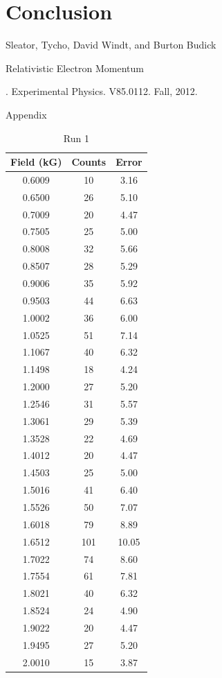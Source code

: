 \section{Conclusion}

\begin{thebibliography}{99}
Sleator, Tycho, David Windt, and Burton Budick \begin{em}Relativistic Electron Momentum\end{em}. Experimental Physics. V85.0112. Fall, 2012.
\end{thebibliography}

\newpage \LARGE{Appendix}
\begin{table}[h!]
\caption{Run 1}
\begin{tabular}{|c|c|c|} \hline
Field	(kG)&	Counts	&	Error	\\	\hline
0.6009	&	10	&	3.16	\\	\hline
0.6500	&	26	&	5.10	\\	\hline
0.7009	&	20	&	4.47	\\	\hline
0.7505	&	25	&	5.00	\\	\hline
0.8008	&	32	&	5.66	\\	\hline
0.8507	&	28	&	5.29	\\	\hline
0.9006	&	35	&	5.92	\\	\hline
0.9503	&	44	&	6.63	\\	\hline
1.0002	&	36	&	6.00	\\	\hline
1.0525	&	51	&	7.14	\\	\hline
1.1067	&	40	&	6.32	\\	\hline
1.1498	&	18	&	4.24	\\	\hline
1.2000	&	27	&	5.20	\\	\hline
1.2546	&	31	&	5.57	\\	\hline
1.3061	&	29	&	5.39	\\	\hline
1.3528	&	22	&	4.69	\\	\hline
1.4012	&	20	&	4.47	\\	\hline
1.4503	&	25	&	5.00	\\	\hline
1.5016	&	41	&	6.40	\\	\hline
1.5526	&	50	&	7.07	\\	\hline
1.6018	&	79	&	8.89	\\	\hline
1.6512	&	101	&	10.05	\\	\hline
1.7022	&	74	&	8.60	\\	\hline
1.7554	&	61	&	7.81	\\	\hline
1.8021	&	40	&	6.32	\\	\hline
1.8524	&	24	&	4.90	\\	\hline
1.9022	&	20	&	4.47	\\	\hline
1.9495	&	27	&	5.20	\\	\hline
2.0010	&	15	&	3.87	\\	\hline
\end{tabular}
\end{table}
